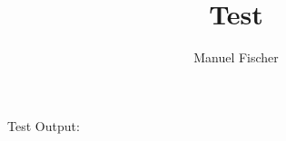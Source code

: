 \documentclass[11pt, a4paper]{article}
\title{Test}
\author{Manuel Fischer}
\begin{document}
	\maketitle
	
	Test Output:\\
	
	
			
\end{document}
